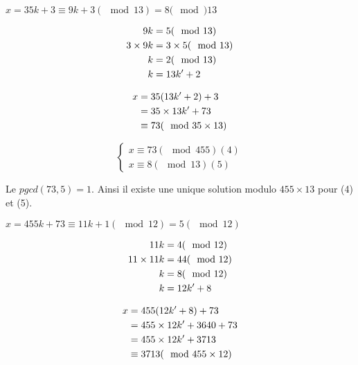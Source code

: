 \documentclass[a4paper,10pt]{article}
\begin{document}
	$x=35k +3 \equiv 9k+3(\mod 13)=8(\mod)13$
	
	\begin{align}
		9k &= 5(\mod 13) \notag \\
		3 \times 9k &= 3 \times 5(\mod 13) \notag \\
		k &=2(\mod 13) \notag \\
		k &= 13k'+2 \notag
	\end{align}
	
	\begin{align}
		x &= 35(13k'+2)+3 \notag \\
		   &= 35 \times 13k' +73 \notag \\
		   &\equiv 73(\mod 35 \times 13) \notag
	\end{align}
	
	\[
	\left\{
	\begin{aligned}	
		x \equiv 73(\mod 455) (4)\\	
		x \equiv 8(\mod 13) (5)
		\end{aligned}	
	\right.\]
	
	Le $pgcd(73,5)=1$. Ainsi il existe une unique solution modulo $455 \times 13 $ pour (4) et (5).
	
	$x=455k +73 \equiv 11k + 1 (\mod 12)=5 (\mod 12)$
	
	\begin{align}
		11k&=4(\mod 12) \notag \\
		11 \times 11k &= 44(\mod 12) \notag \\	
		k &= 8(\mod 12) \notag \\
		k &= 12k' +8 \notag
	\end{align}
	
	\begin{align}
		x &= 455(12k'+8)+73 \notag \\
		   &= 455 \times 12k' + 3640 + 73 \notag \\
		   &= 455 \times 12k'+3713 \notag \\
		   &\equiv 3713 (\mod 455 \times 12) \notag 
	\end{align}
	 
\end{document}
